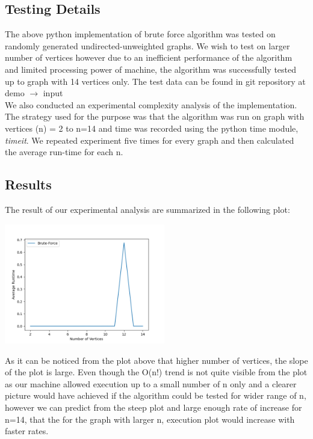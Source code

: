 \documentclass[11pt]{article}
\begin{document}
\subsection{Testing Details}
\label{ssec:fonts}
The above python implementation of brute force algorithm was tested on randomly generated undirected-unweighted graphs. We wish to test on larger number of vertices however due to an inefficient performance of the algorithm and limited processing power of machine, the algorithm was successfully tested up to graph with 14 vertices only. The test data can be found in git repository at demo $\rightarrow$ input\\ We also conducted an experimental complexity analysis of the implementation. The strategy used for the purpose was that the algorithm was run on graph with vertices (n) = 2 to n=14 and time was recorded using the python time module, \textit{timeit}. We repeated experiment five times for every graph and then calculated the average run-time for each n. 

\subsection{Results}
\label{ssec:first}
The result of our experimental analysis are summarized in the following plot:
\begin{center}
\includegraphics[width=7cm]{brute_plot.png}\\
\end{center}
As it can be noticed from the plot above that higher number of vertices, the slope of the plot is large. Even though the O(n!) trend is not quite visible from the plot as our machine allowed execution up to a small number of n only and a clearer picture would have achieved if the algorithm could be tested for wider range of n, however we can predict from the steep plot and large enough rate of increase for n=14, that the for the graph with larger n, execution plot would increase with faster rates.
\end{document}
